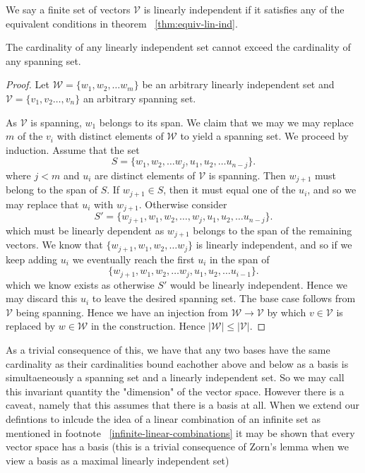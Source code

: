 \documentclass[]{article}
\begin{document}
\begin{defi} 
		We say a finite set of vectors $\mathcal{V}$ is linearly independent if it satisfies any of the equivalent conditions in theorem ~\ref{thm:equiv-lin-ind}.
\end{defi}

\begin{thm}
	The cardinality of any linearly independent set cannot exceed the cardinality of any spanning set.
\end{thm}

\begin{proof}
		Let $\mathcal{W} = \{w_1, w_2, \ldots w_m\}$ be an arbitrary linearly independent set and $\mathcal{V} = \{v_1, v_2 \ldots, v_n\}$ an arbitrary spanning set.
		
		As $\mathcal{V}$ is spanning, $w_1$ belongs to its span. We claim that we may we may replace $m$ of the $v_i$ with distinct elements of $\mathcal{W}$ to yield a spanning set. We proceed by induction. Assume that the set 
		\[
		S = \{w_1, w_2, \ldots w_j, u_1, u_2, \ldots u_{n-j}\}
		.\] 
		where $j < m$ and $u_i$ are distinct elements of $\mathcal{V}$ is spanning. Then $w_{j+1}$ must belong to the span of $S$. If $w_{j+1} \in S$, then it must equal one of the $u_i$, and so we may replace that $u_i$ with $w_{j+1}$. Otherwise consider 
		\[
		S' = \{w_{j+1}, w_1, w_2, \ldots, w_j, u_1, u_2, \ldots u_{n-j}\} 
		.\] 
		which must be linearly dependent as $w_{j+1}$ belongs to the span of the remaining vectors. We know that $\{w_{j+1}, w_1, w_2, \ldots w_j\}$ is linearly independent, and so if we keep adding $u_i$ we eventually reach the first $u_i$ in the span of 
		\[
		\{w_{j+1}, w_1, w_2, \ldots w_j, u_1, u_2, \ldots u_{i-1}\}
		.\] 
	which we know exists as otherwise $S'$ would be linearly independent. Hence we may discard this $u_i$ to leave the desired spanning set. The base case follows from $\mathcal{V}$ being spanning. Hence we have an injection from $\mathcal{W} \to \mathcal{V}$ by which $v \in \mathcal{V}$ is replaced by $w \in \mathcal{W}$ in the construction. Hence $|\mathcal{W}| \leq |\mathcal{V}|$.
\end{proof}

As a trivial consequence of this, we have that any two bases have the same cardinality as their cardinalities bound eachother above and below as a basis is simultaeneously a spanning set and a linearly independent set. So we may call this invariant quantity the "dimension" of the vector space. However there is a caveat, namely that this assumes that there is a basis at all. When we extend our defintions to inlcude the idea of a linear combination of an infinite set as mentioned in footnote ~\ref{infinite-linear-combinations} it may be shown that every vector space has a basis (this is a trivial consequence of Zorn's lemma when we view a basis as a maximal linearly independent set)
\end{document}
